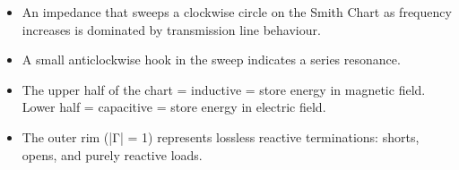       
\begin{itemize}

        \item An impedance that sweeps a clockwise circle on the Smith Chart as frequency increases is dominated by transmission line behaviour.

        \item A small anticlockwise hook in the sweep indicates a series resonance.

        \item The upper half of the chart = inductive = store energy in magnetic field. Lower half = capacitive = store energy in electric field.

        \item The outer rim (|Γ| = 1) represents lossless reactive terminations: shorts, opens, and purely reactive loads.

      
\end{itemize}



